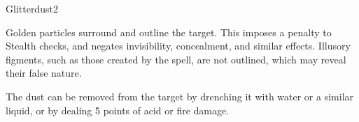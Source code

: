 \begin{spellsection}{Glitterdust}{2}
    \begin{spellheader}
    \end{spellheader}
    \begin{spellcontent}
        \begin{spelltargetinginfo}
        \end{spelltargetinginfo}
        \begin{spelleffects}
            \spelleffect Golden particles surround and outline the target. This imposes a  penalty to Stealth checks, and negates invisibility, concealment, and similar effects. Illusory figments, such as those created by the  spell, are not outlined, which may reveal their false nature.

            The dust can be removed from the target by drenching it with water or a similar liquid, or by dealing 5 points of acid or fire damage.
            \spelldur \durshort
        \end{spelleffects}
    \end{spellcontent}
    \begin{spellfooter}
        \miscastyou
    \end{spellfooter}
\end{spellsection}

